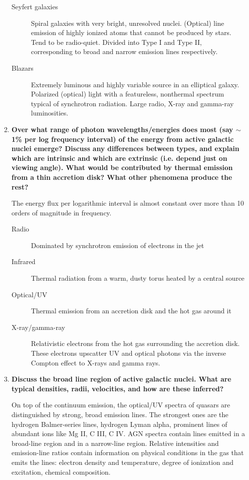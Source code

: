 \documentclass[a4paper]{article}
\begin{document}
\begin{enumerate}
\begin{description}
\item[Seyfert galaxies] Spiral galaxies with very bright, unresolved nuclei. (Optical) line emission of highly ionized atoms that cannot be produced by stars. Tend to be radio-quiet. Divided into Type I and Type II, corresponding to broad and narrow emission lines respectively. 

\item[Blazars] Extremely luminous and highly variable source in an elliptical galaxy. Polarized (optical) light with a featureless, nonthermal spectrum typical of synchrotron radiation. Large radio, X-ray and gamma-ray luminosities. 

\end{description}

\item \textbf{Over what range of photon wavelengths/energies does most (say $\sim$1\% per log frequency interval) of the energy from active galactic nuclei emerge? Discuss any differences between types, and explain which are intrinsic and which are extrinsic (i.e. depend just on viewing angle). What would be contributed by thermal emission from a thin accretion disk? What other phenomena produce the rest?}

The energy flux per logarithmic interval is almost constant over more than 10 orders of magnitude in frequency. 

\begin{description}
\item[Radio] Dominated by synchrotron emission of electrons in the jet
\item[Infrared] Thermal radiation from a warm, dusty torus heated by a central source
\item[Optical/UV] Thermal emission from an accretion disk and the hot gas around it
\item[X-ray/gamma-ray] Relativistic electrons from the hot gas surrounding the accretion disk. These electrons upscatter UV and optical photons via the inverse Compton effect to X-rays and gamma rays. 
\end{description}

\item \textbf{Discuss the broad line region of active galactic nuclei. What are typical densities, radii, velocities, and how are these inferred?}

On top of the continuum emission, the optical/UV spectra of quasars are distinguished by strong, broad emission lines. The strongest ones are the hydrogen Balmer-series lines, hydrogen Lyman alpha, prominent lines of abundant ions like Mg II, C III, C IV. AGN spectra contain lines emitted in a broad-line region and in a narrow-line region. Relative intensities and emission-line ratios contain information on physical conditions in the gas that emits the lines: electron density and temperature, degree of ionization and excitation, chemical composition. 


\end{enumerate}
\end{document}
